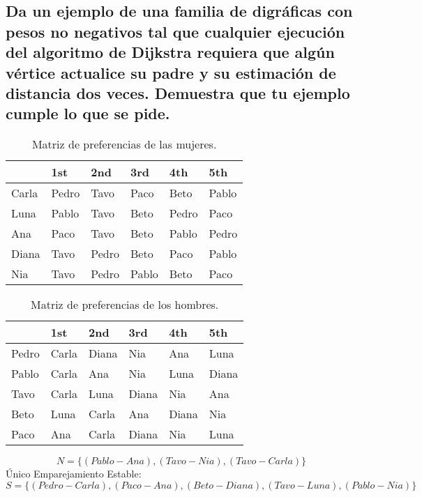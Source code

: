 \documentclass[12pt]{article}
\begin{document}
	\subsection{Da un ejemplo de una familia de digráficas con pesos no negativos tal que cualquier ejecución del algoritmo de Dijkstra requiera que algún vértice actualice su padre y su estimación de distancia dos veces. Demuestra que tu ejemplo cumple lo que se pide.}
	 \begin{table}[h!]
	 	\begin{center}
	 		\label{tab:wedding_problem_W}
	 		\begin{tabular}{C{2cm} ||C{2cm} |C{2cm} |C{2cm} |C{2cm} |C{2cm} |}
	 			\textbf{} & \textbf{1st} & \textbf{2nd} & \textbf{3rd}  & \textbf{4th} & \textbf{5th}\\
	 			\hline
	 			Carla & Pedro & Tavo & Paco & Beto & Pablo\\
	 			\hline
	 			Luna & Pablo & Tavo & Beto & Pedro & Paco\\
	 			\hline
	 			Ana & Paco & Tavo & Beto & Pablo & Pedro\\
	 			\hline
	 			 Diana& Tavo & Pedro & Beto & Paco & Pablo\\
	 			 \hline
	 			 Nia & Tavo & Pedro & Pablo & Beto & Paco\\
	 		\end{tabular}
	 		\caption{Matriz de preferencias de las mujeres.}
	 	\end{center}
	 \end{table}
  \begin{table}[h!]
 	\begin{center}
 		\label{tab:wedding_problem_M}
 		\begin{tabular}{C{2cm} ||C{2cm} |C{2cm} |C{2cm} |C{2cm} |C{2cm} |}
 			\textbf{} & \textbf{1st} & \textbf{2nd} & \textbf{3rd}  & \textbf{4th} & \textbf{5th}\\
 			\hline
 			Pedro & Carla & Diana & Nia & Ana & Luna\\
 			\hline
 			Pablo & Carla & Ana & Nia & Luna & Diana\\
 			\hline
 			Tavo & Carla & Luna & Diana & Nia & Ana\\
 			\hline
 			Beto& Luna & Carla & Ana & Diana & Nia\\
 			\hline
 			Paco & Ana & Carla & Diana & Nia & Luna\\
 		\end{tabular}
 		\caption{Matriz de preferencias de los hombres.}
 	\end{center}
 \end{table}
\begin{equation}\label{N_set}
N = \{(Pablo-Ana), (Tavo-Nia), (Tavo-Carla)\} 
\end{equation}
Único Emparejamiento Estable:
\begin{equation}\label{S_set1}
S = \{(Pedro-Carla), (Paco-Ana), (Beto-Diana), (Tavo-Luna), (Pablo-Nia)\} 
\end{equation}
\end{document}
